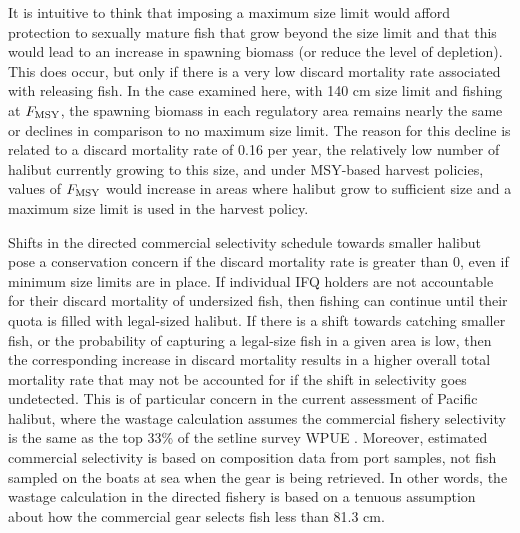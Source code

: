 It is intuitive to think that imposing a maximum size limit would afford protection to sexually mature fish that grow beyond the size limit and that this would lead to an increase in spawning biomass (or reduce the level of depletion).  This does occur, but only if there is a very low discard mortality rate associated with releasing fish.  In the case examined here, with 140 cm size limit and fishing at $F_{\rm{MSY}}$, the spawning biomass in each regulatory area remains nearly the same or  declines in comparison to no maximum size limit.  The reason for this decline is related to a discard mortality rate of 0.16 per year, the relatively low number of halibut currently growing to this size, and under MSY-based harvest policies, values of $F_{\rm{MSY}}$ would increase in areas where halibut grow to sufficient size and a maximum size limit is used in the harvest policy.

Shifts in the directed commercial selectivity schedule towards smaller halibut pose a conservation concern if the discard mortality rate is greater than 0, even if minimum size limits are in place. If individual IFQ holders are not accountable for their discard mortality of undersized fish, then fishing can continue until their quota is filled with legal-sized halibut.  If there is a shift towards catching smaller fish, or the probability of capturing a legal-size fish in a given area is low, then the corresponding increase in discard mortality  results in a higher overall total mortality rate that may not be accounted for if the shift in selectivity goes undetected.  This is of particular concern in the current assessment of Pacific halibut, where the wastage calculation assumes the commercial fishery selectivity is the same as the top 33\% of the setline survey WPUE \citep{gilroy2009wastage}.  Moreover, estimated commercial selectivity is based on composition data from port samples, not fish sampled on the boats at sea when the gear is being retrieved. In other words, the wastage calculation in the directed fishery is based on a tenuous assumption about how the commercial gear selects fish less than 81.3 cm.

